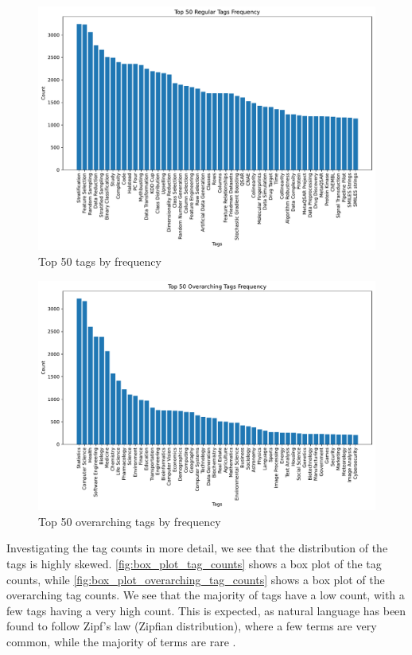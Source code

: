 \begin{figure}[h]
    \centering
    \includegraphics[width=\textwidth]{figures/top_50_frequency.pdf}
    \caption{Top 50 tags by frequency}
    \label{fig:top_50_frequency}
\end{figure}

\begin{figure}[h]
    \centering
    \includegraphics[width=\textwidth]{figures/top_50_overarching_frequency.pdf}
    \caption{Top 50 overarching tags by frequency}
    \label{fig:top_50_overarching_frequency}
\end{figure}

Investigating the tag counts in more detail, we see that the distribution of the tags is highly skewed. \cref{fig:box_plot_tag_counts} shows a box plot of the tag counts, while \cref{fig:box_plot_overarching_tag_counts} shows a box plot of the overarching tag counts. We see that the majority of tags have a low count, with a few tags having a very high count. This is expected, as natural language has been found to follow Zipf's law (Zipfian distribution), where a few terms are very common, while the majority of terms are rare \cite{zipf_psycho-biology_1935, piantadosi_zipfs_2014}.

